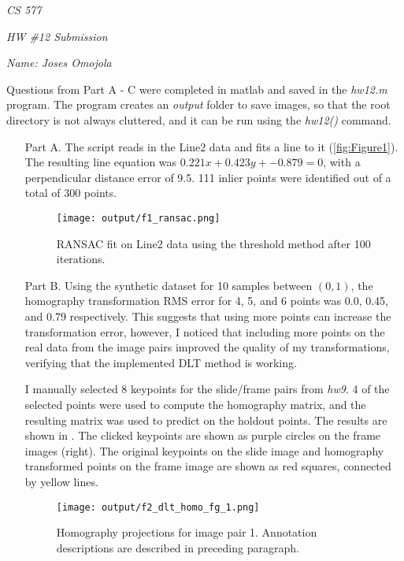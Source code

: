 \documentclass[12pt]{report}
\begin{document}
\centerline{\it CS 577}
\centerline{\it HW \#12 Submission}
\centerline{\it Name: Joses Omojola}

Questions from Part A - C were completed in matlab and saved in the \emph{hw12.m} program. The program creates an \emph{output} folder to save images, so that the 
root directory is not always cluttered, and it can be run using the \textit{hw12()} command. 

\begin{enumerate}

    \item[Part A.] The script reads in the Line2 data and fits a line to it (\autoref{fig:Figure1}). The resulting line equation was $0.221x + 0.423y + -0.879 = 0$, with 
    a perpendicular distance error of 9.5. 111 inlier points were identified out of a total of 300 points.

    \begin{figure}[H]
        \centering
        \texttt{[image: output/f1\_ransac.png]}
        \caption{RANSAC fit on Line2 data using the threshold method after 100 iterations.}
        \label{fig:Figure1}
    \end{figure}

    \item[Part B.] Using the synthetic dataset for 10 samples between $(0,1)$, the homography transformation RMS error for 4, 5, and 6 points was 0.0, 0.45, and 0.79 
    respectively. This suggests that using more points can increase the transformation error, however, I noticed that including more points on the real data from the 
    image pairs improved the quality of my transformations, verifying that the implemented DLT method is working.  

    I manually selected 8 keypoints for the slide/frame pairs from \emph{hw9}. 4 of the selected points were used to compute the homography matrix, and the resulting matrix 
    was used to predict on the holdout points. The results are shown in . The clicked keypoints are shown as purple circles on the 
    frame images (right). The original keypoints on the slide image and homography transformed points on the frame image are shown as red squares, connected by yellow lines.

    \begin{figure}[H]
        \centering
        \texttt{[image: output/f2\_dlt\_homo\_fg\_1.png]}
        \caption{Homography projections for image pair 1. Annotation descriptions are described in preceding paragraph.}
        \label{fig:Figure2}
    \end{figure}


\end{enumerate}
\end{document}
